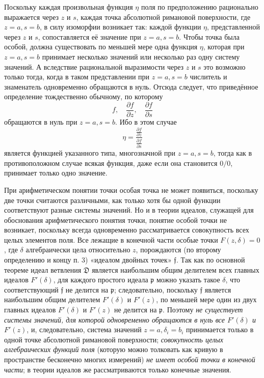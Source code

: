 \documentclass[11pt]{article}
\providecommand{\p}{\partial}
\providecommand{\frD}{\mathfrak D}
\providecommand{\frf}{\mathfrak f}
\providecommand{\frp}{\mathfrak p}
\begin{document}
Поскольку каждая произвольная функция \(\eta\) поля по предположению рационально выражается через \(z\) и \(s\), каждая точка абсолютной римановой поверхности, где \(z=a,s=b\), в силу изоморфии возникает так: каждой функции \(\eta\), представленной через \(z\) и \(s\), сопоставляется её значение при \(z=a,s=b\). Чтобы точка была особой, должна существовать по меньшей мере одна функция \(\eta\), которая при \(z=a,s=b\) принимает несколько значений или несколько раз одну систему значений. А вследствие рациональной выразимости через \(z\) и \(s\) это возможно только тогда, когда в таком представлении при \(z=a,s=b\) числитель и знаменатель одновременно обращаются в нуль. Отсюда следует, что приведённое определение тождественно обычному, по которому
\[
f,\quad \frac{\p f}{\p z},\quad \frac{\p f}{\p s}
\]
обращаются в нуль при \(z=a,s=b\). Ибо в этом случае
\[
\eta=\frac{\frac{\p f}{\p z}}{\frac{\p f}{\p s}}
\]
является функцией указанного типа, многозначной при \(z=a,s=b\), тогда как в противоположном случае всякая функция, даже если она становится \(0/0\), принимает только одно значение.

При арифметическом понятии точки особая точка не может появиться, поскольку две точки считаются различными, как только хотя бы одной функции соответствуют разные системы значений. Но и в теории идеалов, служащей для обоснования арифметического понятия точки, понятие особой точки не возникает, поскольку всегда одновременно рассматривается совокупность всех целых элементов поля. Все лежащие в конечной части особые точки \(F(z,\delta)=0\), где \(\delta\) алгебраически цела относительно \(z\), порождаются (по второму определению и концу п. 3) «идеалом двойных точек» \(\frf\). Так как по основной теореме идеал ветвления \(\frD\) является наибольшим общим делителем всех главных идеалов \(F'(\delta)\), для каждого простого идеала \(\frp\) можно указать такое \(\delta\), что соответствующий \(\frf\) не делится на \(\frp\); следовательно, поскольку \(\frf\) является наибольшим общим делителем \(F'(\delta)\) и \(F'(z)\), по меньшей мере один из двух главных идеалов \(F'(\delta)\) и \(F'(z)\) не делится на \(\frp\). Поэтому \emph{не существует системы значений, для которой одновременно обращаются в нуль все \(F'(\delta)\) и \(F'(z)\)}, и, следовательно, система значений \(z=a,\delta_i=b_i\) принимается только в одной точке абсолютной римановой поверхности; \emph{совокупность целых алгебраических функций поля} (которую можно толковать как кривую в пространстве бесконечно многих измерений) \emph{не имеет особой точки в конечной части}; в теории идеалов же рассматриваются только конечные значения.
\end{document}
